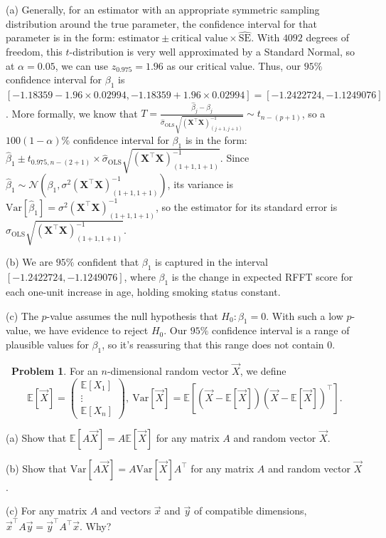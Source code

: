 \documentclass[12pt,oneside]{article}
\newcommand{\E}{\mathbb{E}}
\newcommand{\Var}{\text{Var}}
\newcommand{\SE}{\text{SE}}
\newcommand{\OLS}{\text{OLS}}
\newcommand{\N}{\mathcal{N}}
\theoremstyle{definition}
\newtheorem{problem}{\faPen \ Problem}
\theoremstyle{remark}
\begin{document}
\begin{solutionbox}
(a) Generally, for an estimator with an appropriate symmetric sampling distribution around the true parameter, the confidence interval for that parameter is in the form: $\text{estimator} \pm \text{critical value} \times \widehat{\SE}$. With $4092$ degrees of freedom, this $t$-distribution is very well approximated by a Standard Normal, so at $\alpha = 0.05$, we can use $z_{0.975} = 1.96$ as our critical value. Thus, our $95\%$ confidence interval for $\beta_1$ is $[-1.18359 - 1.96 \times 0.02994, -1.18359 + 1.96 \times 0.02994] = [-1.2422724, -1.1249076]$. More formally, we know that $T = \frac{\hat{\beta}_{j} - \beta_j}{\hat{\sigma}_{\OLS} \sqrt{(\boldsymbol{X}^{\top} \boldsymbol{X})^{-1}_{(j + 1, j + 1)}}} \sim t_{n - (p + 1)}$, so a $100(1 - \alpha)\%$ confidence interval for $\beta_1$ is in the form: $\hat{\beta}_{1} \pm t_{0.975, n - (2 + 1)} \times \hat{\sigma}_{\OLS} \sqrt{(\boldsymbol{X}^{\top} \boldsymbol{X})^{-1}_{(1 + 1, 1 + 1)}}$. Since $\hat{\beta}_1 \sim \N \left( \beta_1, \sigma^2 (\boldsymbol{X}^{\top} \boldsymbol{X})^{-1}_{(1 + 1, 1 + 1)} \right)$, its variance is $\Var[\hat{\beta}_{1}] = \sigma^2 (\boldsymbol{X}^{\top} \boldsymbol{X})^{-1}_{(1 + 1, 1 + 1)}$, so the estimator for its standard error is $\hat{\sigma}_{\OLS} \sqrt{(\boldsymbol{X}^{\top} \boldsymbol{X})^{-1}_{(1 + 1, 1 + 1)}}$.

(b) We are $95\%$ confident that $\beta_1$ is captured in the interval $[-1.2422724, -1.1249076]$, where $\beta_1$ is the change in expected RFFT score for each one-unit increase in age, holding smoking status constant. 

(c) The $p$-value assumes the null hypothesis that $H_0: \beta_1 = 0$. With such a low $p$-value, we have evidence to reject $H_0$. Our $95\%$ confidence interval is a range of plausible values for $\beta_1$, so it's reassuring that this range does not contain $0$.
\end{solutionbox}

\begin{problem}
For an $n$-dimensional random vector $\vec{X}$, we define \[
\E[\vec{X}] = 
\begin{pmatrix}
\E[X_{1}] \\
\vdots \\
\E[X_{n}]
\end{pmatrix}, \ 
\Var[\vec{X}] = \E \left[ (\vec{X} - \E[\vec{X}])(\vec{X} - \E[\vec{X}])^{\top} \right].
\]

(a) Show that $\E[A \vec{X}] = A \E[\vec{X}]$ for any matrix $A$ and random vector $\vec{X}$.

(b) Show that $\Var[A \vec{X}] = A \Var[\vec{X}] A^{\top}$ for any matrix $A$ and random vector $\vec{X}$.

(c) For any matrix $A$ and vectors $\vec{x}$ and $\vec{y}$ of compatible dimensions, $\vec{x}^{\top} A \vec{y} = \vec{y}^{\top} A^{\top} \vec{x}$. Why?
\end{problem}
\end{document}
